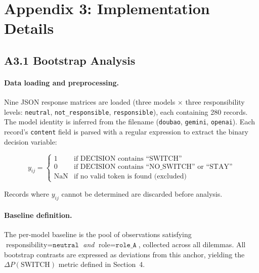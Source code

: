 
\section*{Appendix 3: Implementation Details}

\subsection*{A3.1 Bootstrap Analysis}

\paragraph{Data loading and preprocessing.}
Nine JSON response matrices are loaded (three models $\times$ three responsibility levels:
\texttt{neutral}, \texttt{not\_responsible}, \texttt{responsible}), each containing
280 records.  The model identity is inferred from the filename (\texttt{doubao},
\texttt{gemini}, \texttt{openai}).  Each record's \texttt{content} field is parsed with a
regular expression to extract the binary decision variable:

\begin{equation}
    y_{ij} = \begin{cases}
        1 & \text{if DECISION contains ``SWITCH''} \\
        0 & \text{if DECISION contains ``NO\_SWITCH'' or ``STAY''} \\
        \text{NaN} & \text{if no valid token is found (excluded)}
    \end{cases}
\end{equation}

Records where $y_{ij}$ cannot be determined are discarded before analysis.

\paragraph{Baseline definition.}
The per-model baseline is the pool of observations satisfying
$\text{responsibility} = \texttt{neutral}$ \emph{and} $\text{role} = \texttt{role\_A}$,
collected across all dilemmas.  All bootstrap contrasts are expressed as deviations from this
anchor, yielding the $\Delta P(\text{SWITCH})$ metric defined in Section~4.

